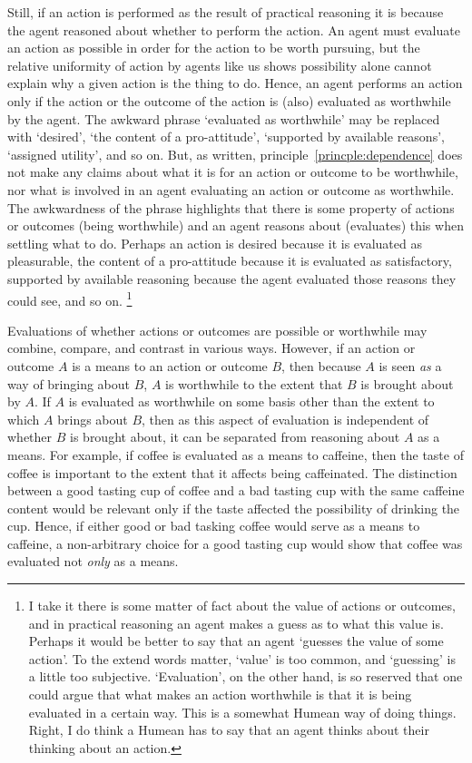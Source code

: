 \documentclass[10pt]{article}
\begin{document}
Still, if an action is performed as the result of practical reasoning it is because the agent reasoned about whether to perform the action.
An agent must evaluate an action as possible in order for the action to be worth pursuing, but the relative uniformity of action by agents like us shows possibility alone cannot explain why a given action is the thing to do.
Hence, an agent performs an action only if the action or the outcome of the action is (also) evaluated as worthwhile by the agent.
The awkward phrase `evaluated as worthwhile' may be replaced with `desired', `the content of a pro-attitude', `supported by available reasons', `assigned utility', and so on.
But, as written, principle~\ref{princple:dependence} does not make any claims about what it is for an action or outcome to be worthwhile, nor what is involved in an agent evaluating an action or outcome as worthwhile.
The awkwardness of the phrase highlights that there is some property of actions or outcomes (being worthwhile) and an agent reasons about (evaluates) this when settling what to do.
Perhaps an action is desired because it is evaluated as pleasurable, the content of a pro-attitude because it is evaluated as satisfactory, supported by available reasoning because the agent evaluated those reasons they could see, and so on.\nolinebreak
\footnote{
  I take it there is some matter of fact about the value of actions or outcomes, and in practical reasoning an agent makes a guess as to what this value is.
  Perhaps it would be better to say that an agent `guesses the value of some action'.
  To the extend words matter, `value' is too common, and `guessing' is a little too subjective.
  `Evaluation', on the other hand, is so reserved that one could argue that what makes an action worthwhile is that it is being evaluated in a certain way.
  This is a somewhat Humean way of doing things.
  {\color{red} Right, I do think a Humean has to say that an agent thinks about their thinking about an action.}
}

Evaluations of whether actions or outcomes are possible or worthwhile may combine, compare, and contrast in various ways.
However, if an action or outcome \(A\) is a means to an action or outcome \(B\), then because \(A\) is seen \emph{as} a way of bringing about \(B\), \(A\) is worthwhile to the extent that \(B\) is brought about by \(A\).
If \(A\) is evaluated as worthwhile on some basis other than the extent to which \(A\) brings about \(B\), then as this aspect of evaluation is independent of whether \(B\) is brought about, it can be separated from reasoning about \(A\) as a means.
For example, if coffee is evaluated as a means to caffeine, then the taste of coffee is important to the extent that it affects being caffeinated.
The distinction between a good tasting cup of coffee and a bad tasting cup with the same caffeine content would be relevant only if the taste affected the possibility of drinking the cup.
Hence, if either good or bad tasking coffee would serve as a means to caffeine, a non-arbitrary choice for a good tasting cup would show that coffee was evaluated not \emph{only} as a means.
\end{document}
